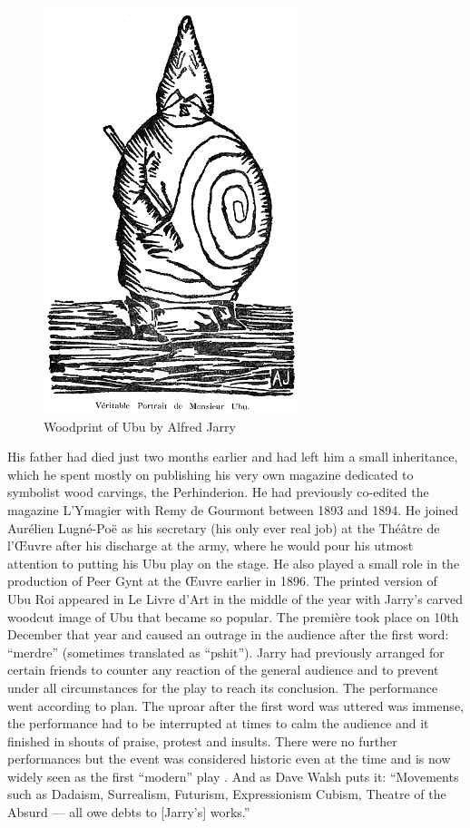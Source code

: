 \begin{figure}[htb] %
  \centering
  \includegraphics[height=0.3\textheight]{images/ubu}
  \caption[Ubu]{Woodprint of Ubu by Alfred Jarry}
\label{fig:UBU}
\end{figure}

His father had died just two months earlier and had left him a small inheritance, which he spent mostly on publishing his very own magazine dedicated to symbolist wood carvings, the Perhinderion. He had previously co-edited the magazine L'Ymagier with Remy de Gourmont between 1893 and 1894. He joined Aurélien Lugné-Poë as his secretary (his only ever real job) at the Théâtre de l'Œuvre after his discharge at the army, where he would pour his utmost attention to putting his Ubu play on the stage. He also played a small role in the production of Peer Gynt at the Œuvre earlier in 1896. The printed version of Ubu Roi appeared in Le Livre d'Art in the middle of the year with Jarry's carved woodcut image of Ubu that became so popular. The première took place on 10th December that year and caused an outrage in the audience after the first word: ``merdre'' (sometimes translated as ``pshit''). Jarry had previously arranged for certain friends to counter any reaction of the general audience and to prevent under all circumstances for the play to reach its conclusion. The performance went according to plan. The uproar after the first word was uttered was immense, the performance had to be interrupted at times to calm the audience and it finished in shouts of praise, protest and insults. There were no further performances but the event was considered historic even at the time and is now widely seen as the first ``modern'' play \citep[p.168-169]{Brotchie2011}. And as Dave Walsh puts it: ``Movements such as Dadaism, Surrealism, Futurism, Expressionism Cubism, Theatre of the Absurd --- all owe debts to [Jarry's] works.'' \citep{Walsh2001}

